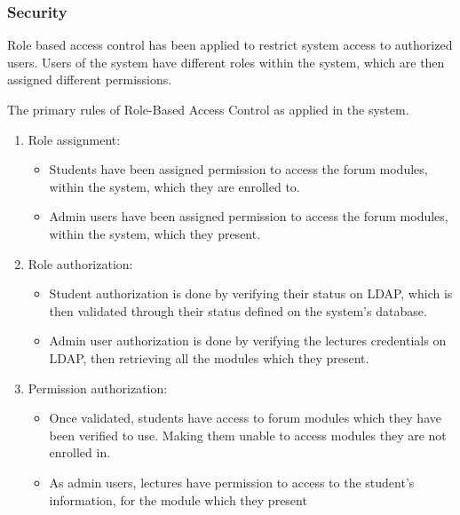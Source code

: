 \documentclass[12pt]{article}
\begin{document}
\subsubsection{Security}
\par{Role based access control has been applied to restrict system access to authorized users. Users of the system have different roles within the system, which are then assigned different permissions.}
\smallskip
\par{The primary rules of Role-Based Access Control as applied in the system.}
\begin{enumerate} 
	\item Role assignment: 
    \begin{itemize}
      \item Students have been assigned permission to access the forum modules, within the system, which they are enrolled to.
      \item Admin users have been assigned permission to access the forum modules, within the system, which they present.
      \end{itemize}
      \item Role authorization: 
    \begin{itemize}
      \item Student authorization is done by verifying their status on LDAP, which is then validated through their status defined on the system’s database.
      \item Admin user authorization is done by verifying the lectures credentials on LDAP, then retrieving all the modules which they present. 
 	\end{itemize}
	\item Permission authorization: 
    \begin{itemize}
    \item Once validated, students have access to forum modules which they have been verified to use. Making them unable to access modules they are not enrolled in. 
	\item As admin users, lectures have permission to access to the student’s information, for the module which they present
    \end{itemize}
\end{enumerate}
\end{document}
